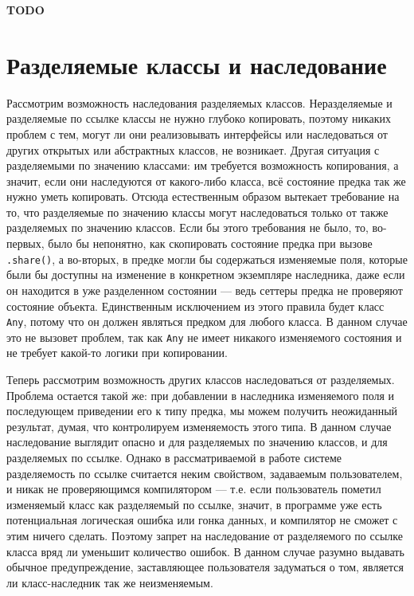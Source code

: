 \documentclass[specification,annotation,times]{itmo-student-thesis}
\newcommand{\todo}[1]{\textbf{TODO}} %
\begin{document}
\todo{gray state} 



\section{Разделяемые классы и наследование}\label{inheritance}

Рассмотрим возможность наследования разделяемых классов.
Неразделяемые и разделяемые по ссылке классы не нужно глубоко копировать, поэтому никаких проблем с тем, могут ли они реализовывать интерфейсы или наследоваться от других открытых или абстрактных классов, не возникает.
Другая ситуация с разделяемыми по значению классами: им требуется возможность копирования, а значит, если они наследуются от какого-либо класса, всё состояние предка так же нужно уметь копировать.
Отсюда естественным образом вытекает требование на то, что разделяемые по значению классы могут наследоваться только от также разделяемых по значению классов.
Если бы этого требования не было, то, во-первых, было бы непонятно, как скопировать состояние предка при вызове \texttt{.share()}, а во-вторых, в предке могли бы содержаться изменяемые поля, которые были бы доступны на изменение в конкретном экземпляре наследника, даже если он находится в уже разделенном состоянии --- ведь сеттеры предка не проверяют состояние объекта.
Единственным исключением из этого правила будет класс \texttt{Any}, потому что он должен являться предком для любого класса. В данном случае это не вызовет проблем, так как \texttt{Any} не имеет никакого изменяемого состояния и не требует какой-то логики при копировании.

Теперь рассмотрим возможность других классов наследоваться от разделяемых.
Проблема остается такой же: при добавлении в наследника изменяемого поля и последующем приведении его к типу предка, мы можем получить неожиданный результат, думая, что контролируем изменяемость этого типа.
 В данном случае наследование выглядит опасно и для разделяемых по значению классов, и для разделяемых по ссылке.
 Однако в рассматриваемой в работе системе разделяемость по ссылке считается неким свойством, задаваемым пользователем, и никак не проверяющимся компилятором --- т.е. если пользователь пометил изменяемый класс как разделяемый по ссылке, значит, в программе уже есть потенциальная логическая ошибка или гонка данных, и компилятор не сможет с этим ничего сделать.
 Поэтому запрет на наследование от разделяемого по ссылке класса вряд ли уменьшит количество ошибок. В данном случае разумно выдавать обычное предупреждение, заставляющее пользователя задуматься о том, является ли класс-наследник так же неизменяемым.
 
\end{document}
